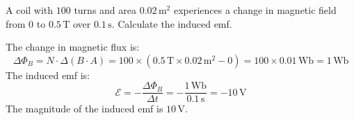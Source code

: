 \begin{Exercise}[title={Induced EMF in a Coil}, label=induced_emf_coil]
A coil with $100$ turns and area $0.02\,\mathrm{m}^2$ experiences a change in magnetic field from $0$ to $0.5\,\mathrm{T}$ over $0.1\,\mathrm{s}$. Calculate the induced emf.
\end{Exercise}
\begin{Answer}[ref=induced_emf_coil]
The change in magnetic flux is:
\[
\Delta \Phi_B = N \cdot \Delta(B \cdot A) = 100 \times (0.5\,\mathrm{T} \times 0.02\,\mathrm{m}^2 - 0)
= 100 \times 0.01\,\mathrm{Wb} = 1\,\mathrm{Wb}
\]
The induced emf is:
\[
\mathcal{E} = -\frac{\Delta \Phi_B}{\Delta t} = -\frac{1\,\mathrm{Wb}}{0.1\,\mathrm{s}} = -10\,\mathrm{V}
\]
The magnitude of the induced emf is $10\,\mathrm{V}$.
\end{Answer}
